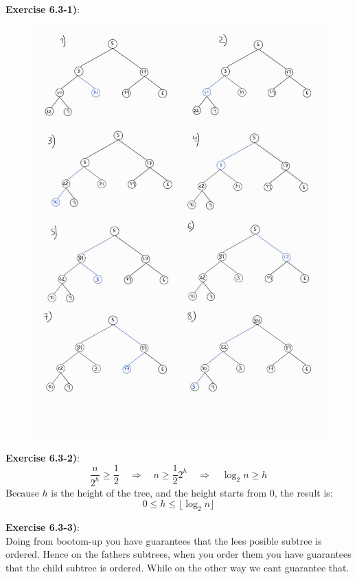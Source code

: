 \documentclass{article}
\newcounter{exercise}[section]   %
\begin{document}
\textbf{Exercise 6.3-1)}:
\begin{figure}[h]
    \centering
    \includegraphics[scale=0.32]{Problem6_3_1.jpeg}
\end{figure}
\newpage

\textbf{Exercise 6.3-2)}:
\[
\frac{n}{2^h} \geq \frac{1}{2} \quad \Rightarrow \quad n \geq \frac{1}{2} 2^h \quad
\Rightarrow \quad \log_2 n \geq h
\]
Because \(h\) is the height of the tree, and the height starts from 0, the result is:
\[
0 \leq h \leq \lfloor \log_2 n \rfloor 
\]

\textbf{Exercise 6.3-3)}:\\
Doing from bootom-up you have guarantees that the lees posible subtree is ordered. Hence
on the fathers subtrees, when you order them you have guarantees that the child subtree
is ordered. While on the other way we cant guarantee that. 
\end{document}
